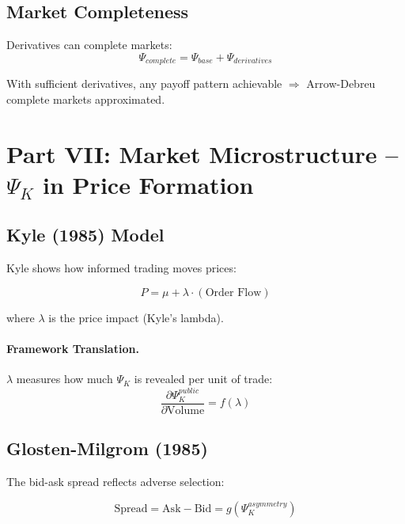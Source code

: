 \subsection{Market Completeness}

Derivatives can complete markets:
\begin{equation}
\Psi_{complete} = \Psi_{base} + \Psi_{derivatives}
\end{equation}

With sufficient derivatives, any payoff pattern achievable $\Rightarrow$
Arrow-Debreu complete markets approximated.


\section{Part VII: Market Microstructure -- $\Psi_K$ in Price Formation}
\label{sec:Y-microstructure}

\subsection{Kyle (1985) Model}

Kyle shows how informed trading moves prices:

\begin{equation}
\boxed{
P = \mu + \lambda \cdot (\text{Order Flow})
}
\label{eq:kyle}
\end{equation}

where $\lambda$ is the price impact (Kyle's lambda).

\paragraph{Framework Translation.}
$\lambda$ measures how much $\Psi_K$ is revealed per unit of trade:
\begin{equation}
\frac{\partial \Psi_K^{public}}{\partial \text{Volume}} = f(\lambda)
\end{equation}

\subsection{Glosten-Milgrom (1985)}

The bid-ask spread reflects adverse selection:

\begin{equation}
\boxed{
\text{Spread} = \text{Ask} - \text{Bid} = g(\Psi_K^{asymmetry})
}
\label{eq:gm-spread}
\end{equation}

